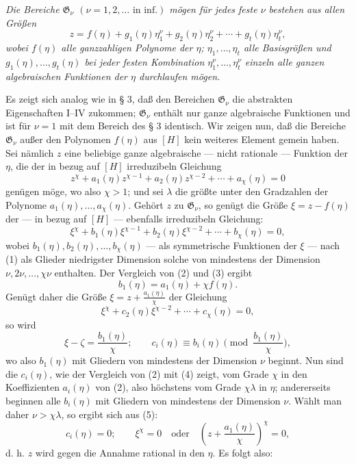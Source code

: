 \documentclass[11pt]{article}
\begin{document}
\emph{Die Bereiche $\mathfrak G_\nu$ $(\nu=1,2,\ldots\text{ in inf.})$ mögen
für jedes feste $\nu$ bestehen aus allen Größen}
\begin{equation}
z=f(\eta)+g_1(\eta)\eta_1^\nu+g_2(\eta)\eta_2^\nu+\cdots+g_t(\eta)\eta_t^\nu,
\tag{1}
\end{equation}
\emph{wobei $f(\eta)$ alle ganzzahligen Polynome der $\eta$;
$\eta_1,\ldots,\eta_t$ alle Basisgrößen und $g_1(\eta),\ldots,g_t(\eta)$ bei
jeder festen Kombination $\eta_1^\nu,\ldots,\eta_t^\nu$ einzeln alle ganzen
algebraischen Funktionen der $\eta$ durchlaufen mögen.}

Es zeigt sich analog wie in § 3, daß den Bereichen $\mathfrak G_\nu$ die
abstrakten Eigenschaften I--IV zukommen; $\mathfrak G_\nu$ enthält nur ganze
algebraische Funktionen und ist für $\nu=1$ mit dem Bereich des § 3 identisch.
Wir zeigen nun, daß die Bereiche $\mathfrak G_\nu$ außer den Polynomen
$f(\eta)$ aus $[H]$ kein weiteres Element gemein haben. Sei nämlich $z$ eine
beliebige ganze algebraische --- nicht rationale --- Funktion der $\eta$, die der
in bezug auf $[H]$ irreduzibeln Gleichung
\begin{equation}
z^\chi+a_1(\eta)z^{\chi-1}+a_2(\eta)z^{\chi-2}+\cdots+a_\chi(\eta)=0
\tag{2}
\end{equation}
genügen möge, wo also $\chi>1$; und sei $\lambda$ die größte unter den
Gradzahlen der Polynome $a_1(\eta),\ldots,a_\chi(\eta)$. Gehört $z$ zu
$\mathfrak G_\nu$, so genügt die Größe $\xi=z-f(\eta)$ der --- in bezug auf
$[H]$ --- ebenfalls irreduzibeln Gleichung:
\begin{equation}
\xi^\chi+b_1(\eta)\xi^{\chi-1}+b_2(\eta)\xi^{\chi-2}+\cdots+b_\chi(\eta)=0,
\tag{3}
\end{equation}
wobei $b_1(\eta),b_2(\eta),\ldots,b_\chi(\eta)$ --- als symmetrische Funktionen
der $\xi$ --- nach (1) als Glieder niedrigster Dimension solche von mindestens
der Dimension $\nu,2\nu,\ldots,\chi\nu$ enthalten. Der Vergleich von (2) und
(3) ergibt
\[
 b_1(\eta)=a_1(\eta)+\chi f(\eta).
\]
Genügt daher die Größe $\xi=z+\frac{a_1(\eta)}{\chi}$ der Gleichung
\begin{equation}
\xi^\chi+c_2(\eta)\xi^{\chi-2}+\cdots+c_\chi(\eta)=0,
\tag{4}
\end{equation}
so wird
\begin{equation}
 \xi-\zeta=\frac{b_1(\eta)}{\chi};
 \qquad
 c_i(\eta)\equiv b_i(\eta)\pmod{\frac{b_1(\eta)}{\chi}},
\tag{5}
\end{equation}
wo also $b_1(\eta)$ mit Gliedern von mindestens der Dimension $\nu$ beginnt.
Nun sind die $c_i(\eta)$, wie der Vergleich von (2) mit (4) zeigt, vom Grade
$\chi$ in den Koeffizienten $a_i(\eta)$ von (2), also höchstens vom Grade
$\chi\lambda$ in $\eta$; andererseits beginnen alle $b_i(\eta)$ mit Gliedern
von mindestens der Dimension $\nu$. Wählt man daher
$\nu>\chi\lambda$, so ergibt sich aus (5):
\[
 c_i(\eta)=0;\qquad
 \xi^\chi=0\quad\text{oder}\quad
 \left(z+\frac{a_1(\eta)}{\chi}\right)^\chi=0,
\]
d. h. $z$ wird gegen die Annahme rational in den $\eta$. Es folgt also:
\end{document}
